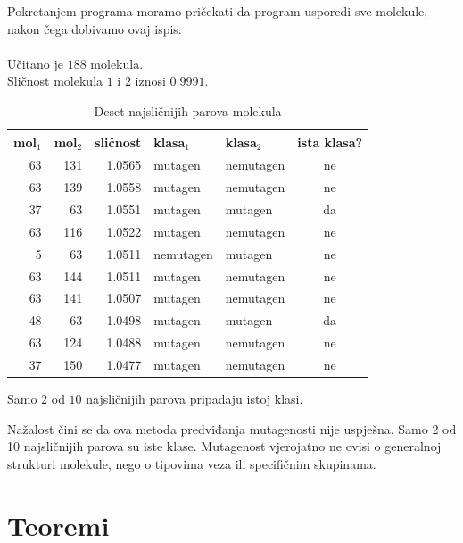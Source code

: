 \documentclass[12pt, letterpaper]{article}
\numberwithin{figure}{section}
\begin{document}
Pokretanjem programa moramo pričekati da program usporedi sve molekule, nakon čega dobivamo ovaj ispis.\\
\\

Učitano je $188$ molekula. \\
Sličnost molekula $1$ i $2$ iznosi $0.9991$.

\begin{table}[H]
    \centering
    \caption{Deset najsličnijih parova molekula}
    \label{tab:mutag_top10}
    \begin{tabular}{rrrllc}
        \toprule
        mol$_1$ & mol$_2$ & sličnost & klasa$_1$ & klasa$_2$ & ista klasa? \\
        \midrule
        63 & 131 & 1.0565 & mutagen     & nemutagen & ne \\
        63 & 139 & 1.0558 & mutagen     & nemutagen & ne \\
        37 & 63  & 1.0551 & mutagen     & mutagen   & da \\
        63 & 116 & 1.0522 & mutagen     & nemutagen & ne \\
        5  & 63  & 1.0511 & nemutagen   & mutagen   & ne \\
        63 & 144 & 1.0511 & mutagen     & nemutagen & ne \\
        63 & 141 & 1.0507 & mutagen     & nemutagen & ne \\
        48 & 63  & 1.0498 & mutagen     & mutagen   & da \\
        63 & 124 & 1.0488 & mutagen     & nemutagen & ne \\
        37 & 150 & 1.0477 & mutagen     & nemutagen & ne \\
        \bottomrule
    \end{tabular}
\end{table}

Samo $2$ od $10$ najsličnijih parova pripadaju istoj klasi.

Nažalost čini se da ova metoda predviđanja mutagenosti nije uspješna. Samo 2 od 10 najsličnijih parova su iste klase. Mutagenost vjerojatno ne ovisi o generalnoj strukturi molekule, nego o tipovima veza ili specifičnim skupinama.

\section{Teoremi}
\end{document}
